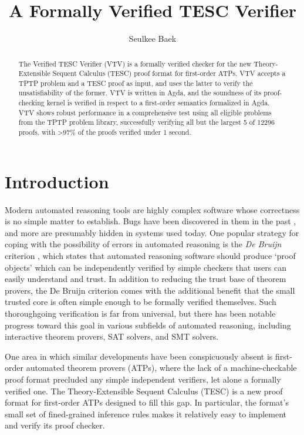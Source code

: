 \documentclass[12pt]{article}
\title{A Formally Verified TESC Verifier}
\author{Seulkee Baek}
\begin{document}
\maketitle

\begin{abstract}

The Verified TESC Verifier (VTV) is a formally verified checker for the new 
Theory-Extensible Sequent Calculus (TESC) proof format for first-order ATPs. 
VTV accepts a TPTP problem and a TESC proof as input, and uses the latter to 
verify the unsatisfiability of the former. VTV is written in Agda, and the 
soundness of its proof-checking kernel is verified in respect to a first-order
semantics formalized in Agda. VTV shows robust performance in a comprehensive 
test using all eligible problems from the TPTP problem library, successfully 
verifying all but the largest 5 of 12296 proofs, with >97\% of the 
proofs verified under 1 second. 

\end{abstract}

\section{Introduction}

Modern automated reasoning tools are highly complex software whose correctness 
is no simple matter to establish. Bugs have been discovered in them in the past 
\cite{reger2017testing,harrison2006towards}, and more are presumably hidden in 
systems used today. One popular strategy for coping with the possibility of errors 
in automated reasoning is the \textit{De Bruijn} criterion \cite{barendregt2005challenge}, 
which states that automated reasoning software should produce `proof objects' which can be 
independently verified by simple checkers that users can easily understand 
and trust. In addition to reducing the trust base of theorem provers, 
the De Bruijn criterion comes with the additional benefit that the 
small trusted core is often simple enough to be formally verified themselves. 
Such thoroughgoing verification is far from universal, but there has been notable 
progress toward this goal in various subfields of automated reasoning, including 
interactive theorem provers, SAT solvers, and SMT solvers.

One area in which similar developments have been conspicuously absent is 
first-order automated theorem provers (ATPs), where the lack of a machine-checkable
proof format \cite{reger2017checkable} precluded any simple independent verifiers, 
let alone a formally verified one. The Theory-Extensible Sequent Calculus (TESC) is a new 
proof format for first-order ATPs designed to fill this gap. In particular,
the format's small set of fined-grained inference rules makes it relatively 
easy to implement and verify its proof checker.
\end{document}
